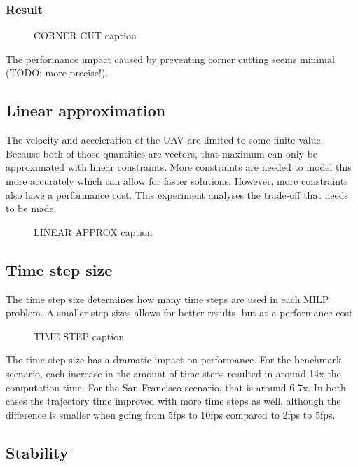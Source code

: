 \subsubsection{Result}
\begin{figure}
CORNER CUT
caption{}
\label{fig:corner-data}
\end{figure}

The performance impact caused by preventing corner cutting seems minimal (TODO: more precise!).



\subsection{Linear approximation}
The velocity and acceleration of the UAV are limited to some finite value. Because both of those quantities are vectors, that maximum can only be approximated with linear constraints. More constraints are needed to model this more accurately which can allow for faster solutions. However, more constraints also have a performance cost. This experiment analyses the trade-off that needs to be made.
\begin{figure}
LINEAR APPROX
caption{}
\label{fig:linear-approx-data}
\end{figure}


\subsection{Time step size}
The time step size determines how many time steps are used in each MILP problem. A smaller step sizes allows for better results, but at a performance cost

\begin{figure}
TIME STEP
caption{}
\label{fig:timestep-data}
\end{figure}
The time step size has a dramatic impact on performance. For the benchmark scenario, each increase in the amount of time steps resulted in around 14x the computation time. For the San Francisco scenario, that is around 6-7x. In both cases the trajectory time improved with more time steps as well, although the difference is smaller when going from 5fps to 10fps compared to 2fps to 5fps.


\subsection{Stability}

